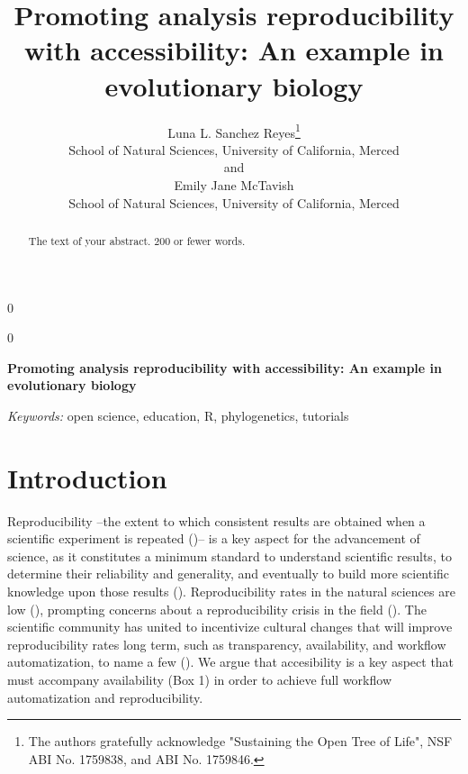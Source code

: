 \documentclass[12pt]{article}
\newcommand{\blind}{0}
\begin{document}
%

\def\spacingset#1{\renewcommand{\baselinestretch}%
{#1}\small\normalsize} \spacingset{1}



\blind
{
  \title{\bf Promoting analysis reproducibility with accessibility: An example in evolutionary biology}
  \author{Luna L. Sanchez Reyes\thanks{
    The authors gratefully acknowledge "Sustaining the Open Tree of Life", NSF ABI No. 1759838, and ABI No. 1759846.}\hspace{.2cm}\\
    School of Natural Sciences, University of California, Merced\\
    and \\
    Emily Jane McTavish \\
    School of Natural Sciences, University of California, Merced}
  \maketitle
} \fi

\blind
{
  \bigskip
  \bigskip
  \bigskip
  \begin{center}
    {\LARGE\bf Promoting analysis reproducibility with accessibility: An example in evolutionary biology}
\end{center}
  \medskip
} \fi

\bigskip
\begin{abstract}
The text of your abstract.  200 or fewer words.
\end{abstract}

\noindent%
{\it Keywords:}  open science, education, R, phylogenetics, tutorials
\vfill

\newpage
\spacingset{1.45} %
\section{Introduction}
\label{sec:intro}

Reproducibility --the extent to which consistent results are obtained when a scientific experiment is repeated (\cite{repdef2021})-- is a key aspect for the advancement of science, as it constitutes a minimum standard to understand scientific results, to determine their reliability and generality, and eventually to build more scientific knowledge upon those results (\cite{king1995replication, peng2011reproducible, powers2019open}).
Reproducibility rates in the natural sciences are low (\cite{ioannidis2005most, prinz2011believe}), prompting concerns about a reproducibility crisis in the field (\cite{baker2016reproducibility}). The scientific community has united to incentivize cultural changes that will improve reproducibility rates long term, such as transparency, availability, and workflow automatization, to name a few (\cite{peng2015reproducibility}).
We argue that accesibility is a key aspect that must accompany availability (Box 1) in order to achieve full workflow automatization and reproducibility.
\end{document}
